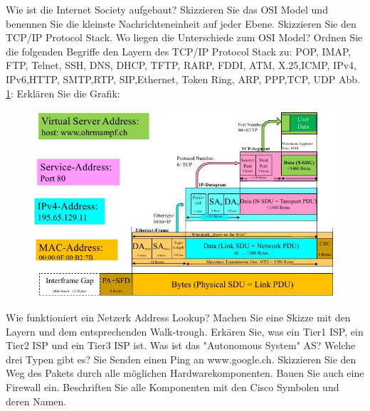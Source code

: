 \documentclass[ngerman,a4paper,12pt]{scrreprt}
\begin{document}
\olR
	\li Wie ist die Internet Society aufgebaut?
	\li Skizzieren Sie das OSI Model und benennen Sie die kleinste Nachrichteneinheit auf jeder Ebene.
	\li Skizzieren Sie den TCP/IP Protocol Stack. Wo liegen die Unterschiede zum OSI Model?
	\li Ordnen Sie die folgenden Begriffe den Layern des TCP/IP Protocol Stack zu:  POP, IMAP, FTP, Telnet, SSH, DNS, DHCP, TFTP, RARP, FDDI, ATM, X.25,ICMP, IPv4, IPv6,HTTP, SMTP,RTP, SIP,Ethernet, Token Ring, ARP, PPP,TCP, UDP
	\li Abb. \ref{LayNewoStr}: Erklären Sie die Grafik:
	\begin{figure}[H]
		\centering
		\includegraphics[width=\textwidth]{img/R8.1.jpg}
		\caption{}
		\label{LayNewoStr}
	\end{figure}
	\li 
	Wie funktioniert ein Netzerk Address Lookup? Machen Sie eine Skizze mit den Layern und dem entsprechenden Walk-trough.
	\li Erkären Sie, was ein Tier1 ISP, ein Tier2 ISP und ein Tier3 ISP ist.
	\li Was ist das "Autonomous System" AS? Welche drei Typen gibt es?
	\li Sie Senden einen Ping an www.google.ch. Skizzieren Sie den Weg des Pakets durch alle möglichen Hardwarekomponenten. Bauen Sie auch eine Firewall ein. Beschriften Sie alle Komponenten mit den Cisco Symbolen und deren Namen.
\olS
\end{document}
